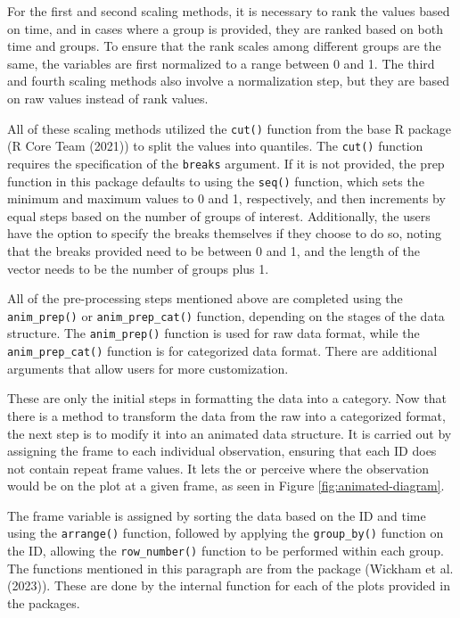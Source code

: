 For the first and second scaling methods, it is necessary to rank the values based on time, and in cases where a group is provided, they are ranked based on both time and groups. To ensure that the rank scales among different groups are the same, the variables are first normalized to a range between 0 and 1. The third and fourth scaling methods also involve a normalization step, but they are based on raw values instead of rank values.

All of these scaling methods utilized the \texttt{cut()} function from the base R package (R Core Team (2021)) to split the values into quantiles. The \texttt{cut()} function requires the specification of the \texttt{breaks} argument. If it is not provided, the prep function in this package defaults to using the \texttt{seq()} function, which sets the minimum and maximum values to 0 and 1, respectively, and then increments by equal steps based on the number of groups of interest. Additionally, the users have the option to specify the breaks themselves if they choose to do so, noting that the breaks provided need to be between 0 and 1, and the length of the vector needs to be the number of groups plus 1.

All of the pre-processing steps mentioned above are completed using the \texttt{anim\_prep()} or \texttt{anim\_prep\_cat()} function, depending on the stages of the data structure. The \texttt{anim\_prep()} function is used for raw data format, while the \texttt{anim\_prep\_cat()} function is for categorized data format. There are additional arguments that allow users for more customization.

These are only the initial steps in formatting the data into a category. Now that there is a method to transform the data from the raw into a categorized format, the next step is to modify it into an animated data structure. It is carried out by assigning the frame to each individual observation, ensuring that each ID does not contain repeat frame values. It lets the  or  perceive where the observation would be on the plot at a given frame, as seen in Figure \ref{fig:animated-diagram}.

The frame variable is assigned by sorting the data based on the ID and time using the \texttt{arrange()} function, followed by applying the \texttt{group\_by()} function on the ID, allowing the \texttt{row\_number()} function to be performed within each group. The functions mentioned in this paragraph are from the  package (Wickham et al. (2023)). These are done by the internal function for each of the plots provided in the packages.

